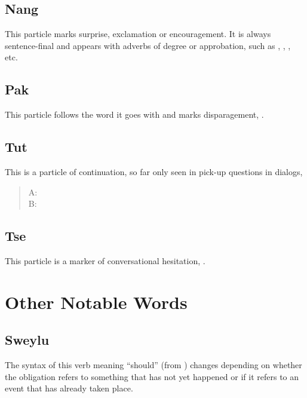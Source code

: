 \subsection{Nang} This particle marks surprise, exclamation or
encouragement.  It is always sentence-final and appears with adverbs
of degree or approbation, such as , ,
, etc. 
   

\subsection{Pak} This particle follows the word it goes with and marks
disparagement,  .

\subsection{Tut} This is a particle of continuation, so far only seen
in pick-up questions in dialogs, 

\begin{quotation}
\noindent A:   \\
\noindent B:  
\end{quotation}

\subsection{Tse} This particle is a marker of conversational
hesitation, . 


\section{Other Notable Words}

\subsection{Sweylu} \label{syn:sweylu} The syntax of this verb meaning
``should'' (from  ) changes depending on
whether the obligation refers to something that has not yet happened or
if it refers to an event that has already taken place.

